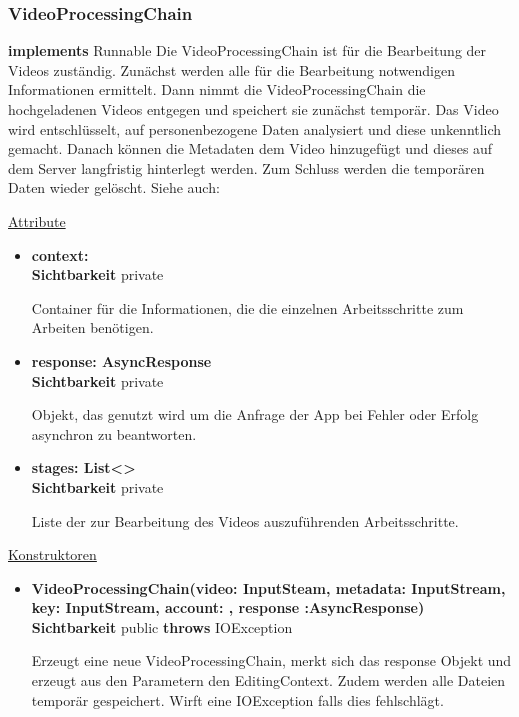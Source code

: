 \subsubsection{VideoProcessingChain} \label{service:klasse:VideoProcessingChain}
\textbf{implements} Runnable \newline
Die VideoProcessingChain ist für die Bearbeitung der Videos zuständig. Zunächst werden alle für die Bearbeitung notwendigen Informationen ermittelt. Dann nimmt die VideoProcessingChain die hochgeladenen Videos entgegen und speichert sie zunächst temporär. Das Video wird entschlüsselt, auf personenbezogene Daten analysiert und diese unkenntlich gemacht. Danach können die Metadaten dem Video hinzugefügt und dieses auf dem Server langfristig hinterlegt werden. Zum Schluss werden die temporären Daten wieder gelöscht.\newline
Siehe auch: 

\underline{Attribute}
\begin{itemize}
\itemsep0pt
\item \textbf{context: } \hfill\\ 
\textbf{Sichtbarkeit} private

Container für die Informationen, die die einzelnen Arbeitsschritte zum Arbeiten benötigen.

\item \textbf{response: AsyncResponse} \hfill\\ 
\textbf{Sichtbarkeit} private

Objekt, das genutzt wird um die Anfrage der App bei Fehler oder Erfolg asynchron zu beantworten.

\item \textbf{stages: List<>} \hfill\\ 
\textbf{Sichtbarkeit} private

Liste der zur Bearbeitung des Videos auszuführenden Arbeitsschritte.
\end{itemize}

\underline{Konstruktoren}
\begin{itemize}
\itemsep0pt
\item \textbf{VideoProcessingChain(video: InputSteam, metadata: InputStream, 
key: InputStream, account: , response :AsyncResponse)} \hfill\\
\textbf{Sichtbarkeit} public \newline
\textbf{throws} IOException

Erzeugt eine neue VideoProcessingChain, merkt sich das response Objekt und erzeugt aus den Parametern den EditingContext. Zudem werden alle Dateien temporär gespeichert. Wirft eine IOException falls dies fehlschlägt.
\end{itemize}

